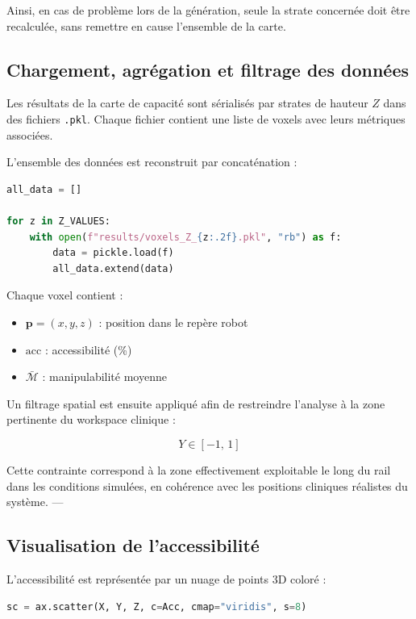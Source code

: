 \documentclass[11pt, a4paper]{article}
\begin{document}
Ainsi, en cas de problème lors de la génération, seule la strate concernée doit être recalculée, sans remettre en cause l’ensemble de la carte.

\subsection{Chargement, agrégation et filtrage des données}

Les résultats de la carte de capacité sont sérialisés par strates de hauteur $Z$ dans des fichiers \texttt{.pkl}. Chaque fichier contient une liste de voxels avec leurs métriques associées.

L’ensemble des données est reconstruit par concaténation :

\begin{lstlisting}[language=python, caption={Chargement des données}]
all_data = []

for z in Z_VALUES:
    with open(f"results/voxels_Z_{z:.2f}.pkl", "rb") as f:
        data = pickle.load(f)
        all_data.extend(data)
\end{lstlisting}

Chaque voxel contient :
\begin{itemize}
  \item $\mathbf{p} = (x,y,z)$ : position dans le repère robot
  \item $\mathrm{acc}$ : accessibilité (\%)
  \item $\bar{\mathcal{M}}$ : manipulabilité moyenne
\end{itemize}

Un filtrage spatial est ensuite appliqué afin de restreindre l’analyse à la zone pertinente du workspace clinique :

\begin{equation}
Y \in [-1,\,1]
\end{equation}

Cette contrainte correspond à la zone effectivement exploitable le long du rail dans les conditions simulées, en cohérence avec les positions cliniques réalistes du système.
---

\subsection{Visualisation de l’accessibilité}

L’accessibilité est représentée par un nuage de points 3D coloré :

\begin{lstlisting}[language=python, caption={Visualisation accessibilité}]
sc = ax.scatter(X, Y, Z, c=Acc, cmap="viridis", s=8)
\end{lstlisting}
\end{document}
